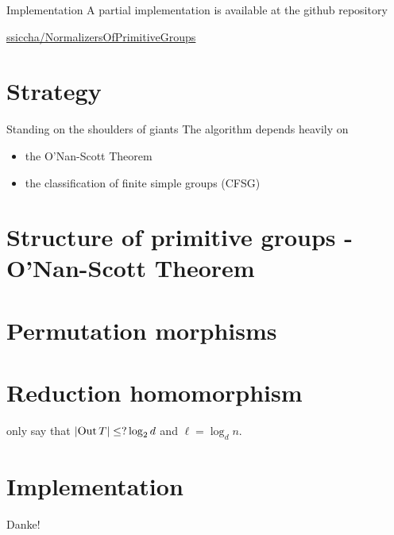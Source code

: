 \documentclass{beamer}
\theoremstyle{plain}
\theoremstyle{definition}
\begin{document}
\begin{frame}{Implementation}
A partial implementation is available at the github repository
\begin{center}
\href{https://github.com/ssiccha/NormalizersOfPrimitiveGroups}{ssiccha/NormalizersOfPrimitiveGroups}
\end{center}
\end{frame}


\section{Strategy}
\begin{frame}{Standing on the shoulders of giants}
The algorithm depends heavily on
\begin{itemize}
\item the O'Nan-Scott Theorem
\item the classification of finite simple groups (CFSG)
\end{itemize}
\end{frame}


\section{Structure of primitive groups - O'Nan-Scott Theorem}

\section{Permutation morphisms}

\section{Reduction homomorphism}
\begin{frame}
only say that
$ \left| \operatorname{Out} T \right|  \leq ? \log_2 d$
and
$\ell = \log_d n$.
\end{frame}

\section{Implementation}

\begin{frame}[standout]
Danke!
\end{frame}

\printbibliography
\end{document}
